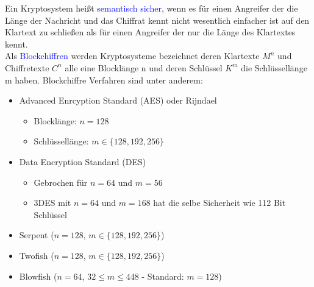 \documentclass[a4paper,12pt,leqno]{article}
\newcommand{\blue}[1]{\textcolor{blue}{#1}}
\begin{document}
Ein Kryptosystem heißt \blue{semantisch sicher}, wenn es für einen Angreifer der die Länge der Nachricht und das Chiffrat kennt nicht wesentlich einfacher ist auf den Klartext zu schließen als für einen Angreifer der nur die Länge des Klartextes kennt.\\
Als \blue{Blockchiffren} werden Kryptosysteme bezeichnet deren Klartexte $M^n$ und Chiffretexte $C^n$ alle eine Blocklänge n und deren Schlüssel $K^m$ die Schlüssellänge m haben.
Blockchiffre Verfahren sind unter anderem:
\begin{itemize}
\item Advanced Enrcyption Standard (AES) oder Rijndael
	\begin{itemize}
	\item Blocklänge: $n= 128$
	\item Schlüssellänge: $m\in \{128,192,256\}$
	\end{itemize}
\item Data Encryption Standard (DES)
	\begin{itemize}
	\item Gebrochen für $n=64$ und $m=56$
	\item 3DES mit $n=64$ und $m=168$ hat die selbe Sicherheit wie 112 Bit Schlüssel
	\end{itemize}
\item Serpent ($n=128$, $m\in\{128,192,256\}$)
\item Twofish ($n=128$, $m\in\{128,192,256\}$)
\item Blowfish ($n=64$, $32\leq m\leq 448$ - Standard: $m=128$)
\end{itemize}
\end{document}
